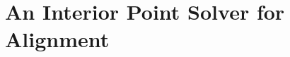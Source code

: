 \newcommand{\llambda}{\mathbf{\lambda}}
\newcommand{\Id}{\mathtt{I}}
\newcommand{\diag}{\mathrm{diag}}
\newcommand{\ggamma}{\mathbf{\gamma}}
\newcommand{\h}{\mathbf{h}}

\section{An Interior Point Solver for Alignment}

